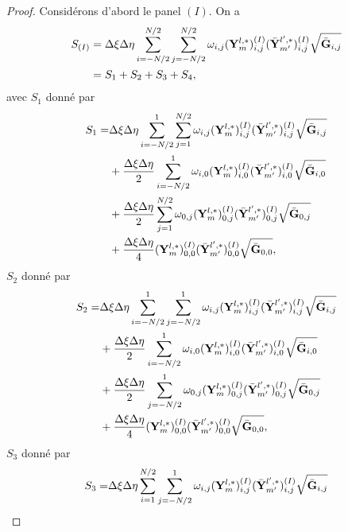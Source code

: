 \begin{proof}
Considérons d'abord le panel $(I)$. On a
\begin{align*}
S_{(I)} & = \Delta \xi \Delta \eta \displaystyle\sum\limits_{i=-N/2}^{N/2} \displaystyle\sum\limits_{j=-N/2}^{N/2} \omega_{i,j} (\mathbf{Y}_m^{l,*})_{i,j}^{(I)} (\bar{\mathbf{Y}}_{m'}^{l',*})_{i,j}^{(I)} \sqrt{\bar{\mathbf{G}}_{i,j}} \\
	& = S_1 + S_2 + S_3 +S_4,
\end{align*}
avec $S_1$ donné par
\begin{align*}
S_1 = & \Delta \xi \Delta \eta \displaystyle\sum\limits_{i=-N/2}^{1} \displaystyle\sum\limits_{j=1}^{N/2} \omega_{i,j} (\mathbf{Y}_m^{l,*})_{i,j}^{(I)} (\bar{\mathbf{Y}}_{m'}^{l',*})_{i,j}^{(I)} \sqrt{\bar{\mathbf{G}}_{i,j}} \\
	& + \dfrac{\Delta \xi \Delta \eta}{2} \displaystyle\sum\limits_{i=-N/2}^{1} \omega_{i,0} (\mathbf{Y}_m^{l,*})_{i,0}^{(I)} (\bar{\mathbf{Y}}_{m'}^{l',*})_{i,0}^{(I)} \sqrt{\bar{\mathbf{G}}_{i,0}}\\
		& + \dfrac{\Delta \xi \Delta \eta}{2} \displaystyle\sum\limits_{j=1}^{N/2} \omega_{0,j} (\mathbf{Y}_m^{l,*})_{0,j}^{(I)} (\bar{\mathbf{Y}}_{m'}^{l',*})_{0,j}^{(I)} \sqrt{\bar{\mathbf{G}}_{0,j}}\\
		& + \dfrac{\Delta \xi \Delta \eta}{4} (\mathbf{Y}_m^{l,*})_{0,0}^{(I)} (\bar{\mathbf{Y}}_{m'}^{l',*})_{0,0}^{(I)} \sqrt{\bar{\mathbf{G}}_{0,0}},
\end{align*}
$S_2$ donné par
\begin{align*}
S_2 = & \Delta \xi \Delta \eta \displaystyle\sum\limits_{i=-N/2}^{1} \displaystyle\sum\limits_{j=-N/2}^{1} \omega_{i,j} (\mathbf{Y}_m^{l,*})_{i,j}^{(I)} (\bar{\mathbf{Y}}_{m'}^{l',*})_{i,j}^{(I)} \sqrt{\bar{\mathbf{G}}_{i,j}} \\
	& + \dfrac{\Delta \xi \Delta \eta}{2} \displaystyle\sum\limits_{i=-N/2}^{1} \omega_{i,0} (\mathbf{Y}_m^{l,*})_{i,0}^{(I)} (\bar{\mathbf{Y}}_{m'}^{l',*})_{i,0}^{(I)} \sqrt{\bar{\mathbf{G}}_{i,0}}\\
		& + \dfrac{\Delta \xi \Delta \eta}{2} \displaystyle\sum\limits_{j=-N/2}^{1} \omega_{0,j} (\mathbf{Y}_m^{l,*})_{0,j}^{(I)} (\bar{\mathbf{Y}}_{m'}^{l',*})_{0,j}^{(I)} \sqrt{\bar{\mathbf{G}}_{0,j}}\\
		& + \dfrac{\Delta \xi \Delta \eta}{4} (\mathbf{Y}_m^{l,*})_{0,0}^{(I)} (\bar{\mathbf{Y}}_{m'}^{l',*})_{0,0}^{(I)} \sqrt{\bar{\mathbf{G}}_{0,0}},
\end{align*}
$S_3$ donné par
\begin{align*}
S_3 = & \Delta \xi \Delta \eta \gsum_{i=1}^{N/2} \gsum_{j=-N/2}^{1} \omega_{i,j} (\mathbf{Y}_m^{l,*})_{i,j}^{(I)} (\bar{\mathbf{Y}}_{m'}^{l',*})_{i,j}^{(I)} \sqrt{\bar{\mathbf{G}}_{i,j}} \\

\end{align*}
\end{proof}
